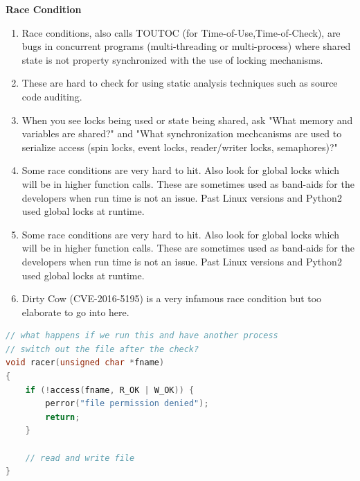 \documentclass[12pt]{Training}
\begin{document}
\textbf{Race Condition}
\begin{enumerate}
    \item Race conditions, also calls TOUTOC (for Time-of-Use,Time-of-Check), are bugs in concurrent programs (multi-threading or multi-process) where shared state is not property synchronized with the use of locking mechanisms.
    \item These are hard to check for using static analysis techniques such as source code auditing.
    \item When you see locks being used or state being shared, ask "What memory and variables are shared?" and "What synchronization mechcanisms are used to serialize access (spin locks, event locks, reader/writer locks, semaphores)?"
    \item Some race conditions are very hard to hit. Also look for global locks which will be in higher function calls. These are sometimes used as band-aids for the developers when run time is not an issue. Past Linux versions and Python2 used global locks at runtime.
    \item Some race conditions are very hard to hit. Also look for global locks which will be in higher function calls. These are sometimes used as band-aids for the developers when run time is not an issue. Past Linux versions and Python2 used global locks at runtime.
    \item Dirty Cow (CVE-2016-5195) is a very infamous race condition but too elaborate to go into here.
\end{enumerate}
\begin{sectionbox}
\begin{lstlisting}[language=C, caption={Race Condition}]
// what happens if we run this and have another process
// switch out the file after the check?
void racer(unsigned char *fname)
{
    if (!access(fname, R_OK | W_OK)) {
        perror("file permission denied");
        return;
    }

    // read and write file
}
\end{lstlisting}
\end{sectionbox}
\end{document}
